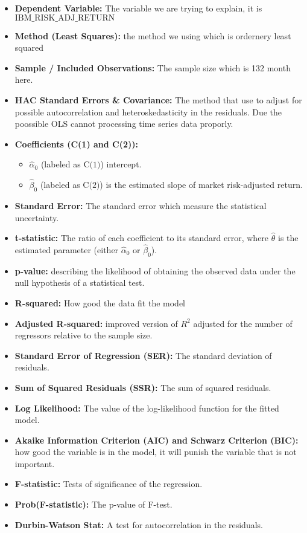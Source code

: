 \documentclass{article} %
\begin{document}
\begin{itemize}
    \item \textbf{Dependent Variable:} The variable we are trying to explain, it is \(\text{IBM\_RISK\_ADJ\_RETURN}\)
    \item \textbf{Method (Least Squares):} the method we using which is ordernery least squared 
    \item \textbf{Sample / Included Observations:} The sample size which is 132 month here. 
    \item \textbf{HAC Standard Errors \& Covariance:} The method that use to adjust for possible autocorrelation and heteroskedasticity in the residuals. Due the poossible OLS cannot processing time series data proporly.
    \item \textbf{Coefficients (C(1) and C(2)):}
    \begin{itemize}
        \item \(\hat{\alpha}_0\) (labeled as \(\text{C(1)}\)) intercept.
        \item \(\hat{\beta}_0\) (labeled as \(\text{C(2)}\)) is the estimated slope of market risk-adjusted return.
    \end{itemize}
    \item \textbf{Standard Error:} The standard error which measure the statistical uncertainty.
    \item \textbf{t-statistic:} The ratio of each coefficient to its standard error,
    where \(\hat{\theta}\) is the estimated parameter (either \(\hat{\alpha}_0\) or \(\hat{\beta}_0\)).
    \item \textbf{p-value:}  describing the likelihood of obtaining the observed data under the null hypothesis of a statistical test.
    \item \textbf{R-squared:} How good the data fit the model
    \item \textbf{Adjusted R-squared:} improved version of \(R^2\) adjusted for the number of regressors relative to the sample size.
    \item \textbf{Standard Error of Regression (SER):} The  standard deviation of residuals.
    \item \textbf{Sum of Squared Residuals (SSR):} The sum of squared residuals.
    \item \textbf{Log Likelihood:} The value of the log-likelihood function for the fitted model.
    \item \textbf{Akaike Information Criterion (AIC) and Schwarz Criterion (BIC):} how good the variable is in the model, it will punish the variable that is not important.
    \item \textbf{F-statistic:} Tests of  significance of the regression.
    \item \textbf{Prob(F-statistic):} The p-value of  F-test.
    \item \textbf{Durbin-Watson Stat:} A test for autocorrelation in the residuals.
\end{itemize}
\end{document}
